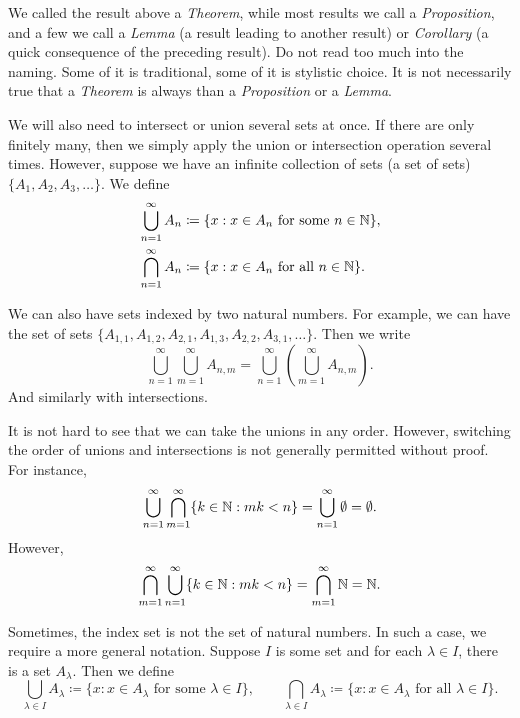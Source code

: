 We called the result above a \emph{Theorem}, while most results we call
a \emph{Proposition}, and a few we call a \emph{Lemma} (a result leading to another result) or
\emph{Corollary} (a quick consequence of the preceding result).
Do not read too much into
the naming.  Some of it is traditional, some of it is stylistic choice.
It is not necessarily true that a \emph{Theorem} is always
 than a
\emph{Proposition} or a \emph{Lemma}.

\medskip

We will also need to intersect or union several sets at once.  If there are
only finitely many, then we simply apply the union or intersection operation
several times.  However, suppose we have an infinite collection
of sets (a set of sets)
$\{ A_1, A_2, A_3, \ldots \}$.  We define
\begin{align*}
& \bigcup_{n=1}^\infty A_n \coloneqq \{ x : x \in A_n \text{ for some } n \in {\mathbb{N}}
\} , \\
& \bigcap_{n=1}^\infty A_n \coloneqq \{ x : x \in A_n \text{ for all } n \in {\mathbb{N}}
\} .
\end{align*}

We can also have sets indexed by two natural numbers.  For example, we can have
the set of sets
$\{ A_{1,1}, A_{1,2}, A_{2,1}, A_{1,3}, A_{2,2}, A_{3,1}, \ldots \}$.  Then
we write 
\begin{equation*}
\bigcup_{n=1}^\infty \bigcup_{m=1}^\infty A_{n,m}
=
\bigcup_{n=1}^\infty \left( \bigcup_{m=1}^\infty A_{n,m} \right) .
\end{equation*}
And similarly with intersections.

It is not hard to see that we can take the unions in any order.  However,
switching the order of unions and intersections is not generally permitted without proof.
For instance,
\begin{equation*}
\bigcup_{n=1}^\infty
\bigcap_{m=1}^\infty
\{ k \in {\mathbb{N}} : mk < n \}
=
\bigcup_{n=1}^\infty \emptyset = \emptyset .
\end{equation*}
However,
\begin{equation*}
\bigcap_{m=1}^\infty
\bigcup_{n=1}^\infty
\{ k \in {\mathbb{N}} : mk < n \}
=
\bigcap_{m=1}^\infty
{\mathbb{N}}
=
{\mathbb{N}}.
\end{equation*}

Sometimes, the index set is not the set of natural numbers.  In such a case, we
require a more general notation.  Suppose $I$ is some set and for each $\lambda \in
I$, there is a set $A_\lambda$.  Then we define
\begin{equation*}
\bigcup_{\lambda \in I} A_\lambda \coloneqq \{ x : x \in A_\lambda \text{ for some }
\lambda \in I
\} ,
\qquad
\bigcap_{\lambda \in I} A_\lambda \coloneqq \{ x : x \in A_\lambda \text{ for all }
\lambda \in I
\} .
\end{equation*}


